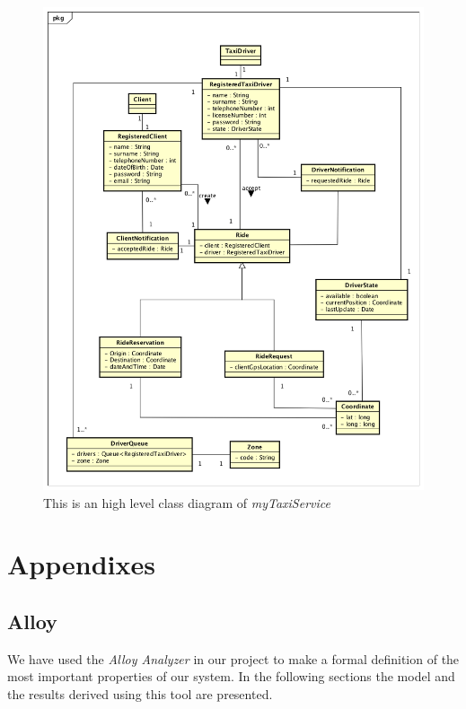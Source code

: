 \documentclass[a4paper]{article}
\let\stdsection\section
\renewcommand\section{\newpage\stdsection}
\begin{document}
\begin{figure}[H]
\includegraphics[width=\sequenceWidth]{ClassDiagramMyTaxiService}
\centering
\caption[UML Class Diagram]{This is an high level class diagram of \emph{myTaxiService}}
\label{fig:classdiagram}
\end{figure}

\section{Appendixes}

\subsection{Alloy}

We have used the \emph{Alloy Analyzer} in our project to make a formal definition of the most important properties of our system. In the following sections the model and the results derived using this tool are presented.

\newlength{\codeWidth}
\setlength{\codeWidth}{\textwidth}
\end{document}
